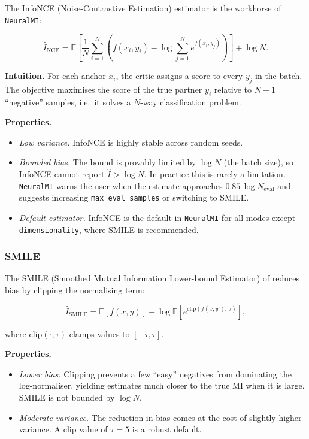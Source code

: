 \documentclass[12pt]{article}
\newcommand{\nmi}{\texttt{NeuralMI}}
\newcommand{\api}[1]{\texttt{#1}}
\newcommand{\E}[1]{\mathbb{E}\!\left[#1\right]}
\begin{document}
The InfoNCE (Noise-Contrastive Estimation) estimator
\citep{oord2018representation} is the workhorse of \nmi{}:

\begin{equation}
  \hat{I}_{\mathrm{NCE}}
  = \E{\frac{1}{N}\sum_{i=1}^N
      \left(f(x_i,y_i) - \log\sum_{j=1}^N e^{f(x_i,y_j)}\right)} + \log N.
  \label{eq:infonce}
\end{equation}

\textbf{Intuition.}  For each anchor $x_i$, the critic assigns a score
to every $y_j$ in the batch.  The objective maximises the score of the
true partner $y_i$ relative to $N-1$ ``negative'' samples, i.e.\ it solves
a $N$-way classification problem.

\textbf{Properties.}
\begin{itemize}[leftmargin=*]
  \item \emph{Low variance.}  InfoNCE is highly stable across random seeds.
  \item \emph{Bounded bias.}  The bound is provably limited by $\log N$ (the
        batch size), so InfoNCE cannot report $\hat{I} > \log N$.  In practice
        this is rarely a limitation.  \nmi{} warns the user when the estimate
        approaches $0.85\,\log N_{\mathrm{eval}}$ and suggests increasing
        \api{max\_eval\_samples} or switching to SMILE.
  \item \emph{Default estimator.}  InfoNCE is the default in \nmi{} for all
        modes except \api{dimensionality}, where SMILE is recommended.
\end{itemize}

\subsubsection{SMILE}
\label{sec:theory:smile}

The SMILE (Smoothed Mutual Information Lower-bound Estimator) of
\citet{song2020understanding} reduces bias by clipping the normalising term:

\begin{equation}
  \hat{I}_{\mathrm{SMILE}}
  = \E{f(x,y)}
    - \log\E{e^{\mathrm{clip}(f(x,y'),\,\tau)}},
  \label{eq:smile}
\end{equation}

where $\mathrm{clip}(\cdot,\tau)$ clamps values to $[-\tau,\tau]$.

\textbf{Properties.}
\begin{itemize}[leftmargin=*]
  \item \emph{Lower bias.}  Clipping prevents a few ``easy'' negatives from
        dominating the log-normaliser, yielding estimates much closer to the
        true MI when it is large.  SMILE is not bounded by $\log N$.
  \item \emph{Moderate variance.}  The reduction in bias comes at the cost of
        slightly higher variance.  A clip value of $\tau=5$ is a robust default.
\end{itemize}
\end{document}
